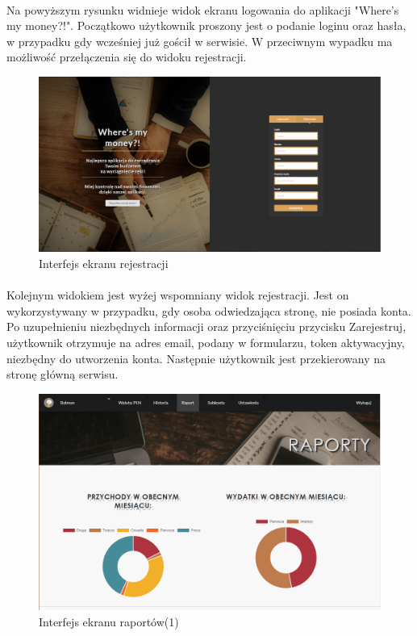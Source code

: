 \documentclass{article}
\begin{document}
	\paragraph*{} Na powyższym rysunku widnieje widok ekranu logowania do aplikacji "Where's my money?!". Początkowo użytkownik proszony jest o podanie loginu oraz hasła, w przypadku gdy wcześniej już gościł w serwisie. W przeciwnym wypadku ma możliwość przełączenia się do widoku rejestracji.
	\begin{figure}[H]
		\hspace*{-4cm}
		\includegraphics[scale=0.4]{assets/rejestr.png}
		\caption[]{Interfejs ekranu rejestracji}
		\label{fig:rejestr}
	\end{figure}
	\paragraph*{} Kolejnym widokiem jest wyżej wspomniany widok rejestracji. Jest on wykorzystywany w przypadku, gdy osoba odwiedzająca stronę, nie posiada konta. Po uzupełnieniu niezbędnych informacji oraz przyciśnięciu przycisku Zarejestruj, użytkownik otrzymuje na adres email, podany w formularzu, token aktywacyjny, niezbędny do utworzenia konta. Następnie użytkownik jest przekierowany na stronę główną serwisu.
\begin{figure}[H]
	\hspace*{-3cm}
	\includegraphics[scale=0.6]{assets/rap1.png}
	\caption[]{Interfejs ekranu raportów(1)}
	\label{fig:rap1}
\end{figure}
\end{document}

